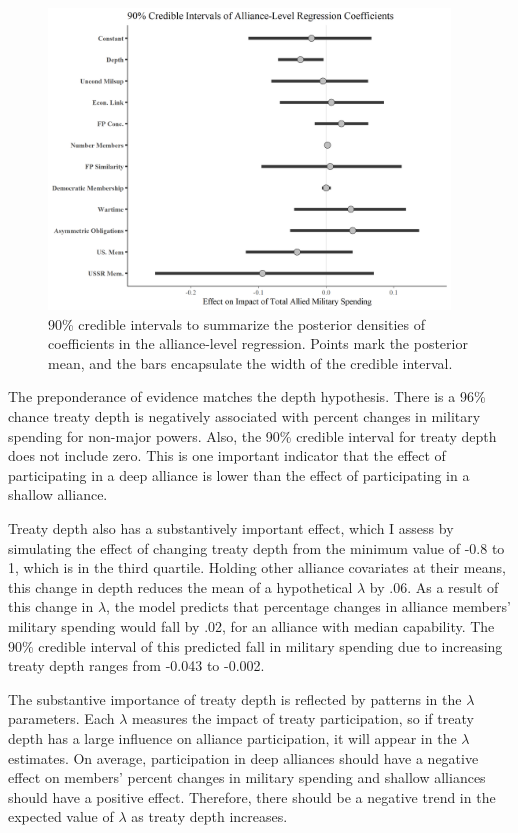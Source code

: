 \documentclass[12pt]{article}
\begin{document}
\begin{figure}[htbp]
	\centering
		\includegraphics[width=0.95\textwidth]{../figures/alliance-reg-nonmaj.png}
	\caption{90\% credible intervals to summarize the posterior densities of coefficients in the alliance-level regression. Points mark the posterior mean, and the bars encapsulate the width of the credible interval.}
	\label{fig:alliance-reg-nonmaj}
\end{figure}


The preponderance of evidence matches the depth hypothesis. 
There is a 96\% chance treaty depth is negatively associated with percent changes in military spending for non-major powers.
Also, the 90\% credible interval for treaty depth does not include zero. 
This is one important indicator that the effect of participating in a deep alliance is lower than the effect of participating in a shallow alliance. 


Treaty depth also has a substantively important effect, which I assess by simulating the effect of changing treaty depth from the minimum value of -0.8 to 1, which is in the third quartile. 
Holding other alliance covariates at their means, this change in depth reduces the mean of a hypothetical $\lambda$ by .06.
As a result of this change in $\lambda$, the model predicts that percentage changes in alliance members' military spending would fall by .02, for an alliance with median capability. 
The 90\% credible interval of this predicted fall in military spending due to increasing treaty depth ranges from -0.043 to -0.002. 


The substantive importance of treaty depth is reflected by patterns in the $\lambda$ parameters. 
Each $\lambda$ measures the impact of treaty participation, so if treaty depth has a large influence on alliance participation, it will appear in the $\lambda$ estimates. 
On average, participation in deep alliances should have a negative effect on members' percent changes in military spending and shallow alliances should have a positive effect.
Therefore, there should be a negative trend in the expected value of $\lambda$ as treaty depth increases.
\end{document}
